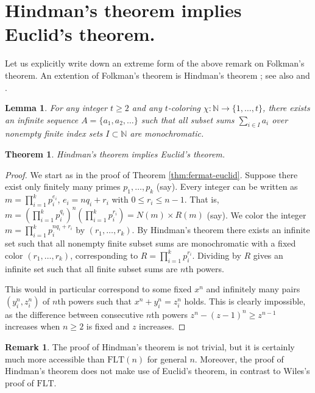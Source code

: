 \documentclass{article}
\theoremstyle{theorem}
\newtheorem{theorem}{Theorem}
\newtheorem{lemma}{Lemma}
\theoremstyle{definition}
\newtheorem*{remark}{Remark}
\newcommand{\N}{\mathbb N}
\newcommand{\FLT}{\mathrm{FLT}}
\begin{document}
\section{Hindman's theorem implies Euclid's theorem.}
{\label{sec:Hindman}}
Let us explicitly write down an extreme form of the above remark on
Folkman's theorem.
An extention of Folkman's theorem is Hindman's theorem  
\cite{Hindman:1974}; see 
also \cite{Baumgartner:1974} and 
\cite[p. 85]{Graham-Rothschild-Spencer}. 
\begin{lemma}
For any integer $t\geq 2$ and any $t$-coloring 
$\chi:\N \rightarrow \{1, \ldots , t\}$, there exists an infinite sequence 
$A=\{a_1, a_2, \ldots \}$ such that all subset sums 
$\sum_{i \in I} a_i$ over nonempty 
finite index sets $I\subset \N$ are monochromatic.
\end{lemma}
\begin{theorem}{\label{thm:Hindman-implies-Euclid}}
Hindman's theorem implies Euclid's theorem.
\end{theorem}
\begin{proof}
We start as in the proof of Theorem {\ref{thm:fermat-euclid}}.
Suppose there exist only finitely many primes $p_1, \ldots, p_k$ (say).
Every integer
can be written as $m= \prod_{i=1}^k p_i^{e_i}$, 
$e_i=nq_i +r_i$ with \mbox{$0 \leq r_i \leq n-1$}. That is, 
$m= \left(\prod_{i=1}^k p_i^{q_i}\right)^n \left( \prod_{i=1}^k
  p_i^{r_i}\right) =N(m)\times R(m)$ (say).
We
color the integer $m= \prod_{i=1}^k p_i^{n q_i +r_i}$ by $(r_1, \ldots ,r_k)$. 
By Hindman's theorem there exists an infinite set such that
all nonempty finite subset sums are monochromatic with a fixed color
$(r_1, \ldots , r_k)$, corresponding to
$R=\prod_{i=1}^k p_i^{r_i}$.
 Dividing by $R$
gives an infinite set such that all finite subset sums
are $n$th powers.

This would
in particular correspond to some fixed $x^n$ and infinitely many 
pairs $(y_i^n,z_i^n)$ of $n$th powers such that $x^n+y_i^n=z_i^n$ holds.
This is clearly impossible, as the difference between
consecutive $n$th powers $z^n-(z-1)^n\geq z^{n-1}$ increases when $n\geq 2$ 
is fixed and $z$ increases. 
\end{proof}
\begin{remark}
The proof of Hindman's theorem is not trivial, but it is certainly much more
accessible than $\FLT(n)$ for general $n$. Moreover, the proof of Hindman's
theorem does not make use of Euclid's theorem, in contrast to Wiles's proof of
$\FLT$.


\end{remark}
\end{document}
